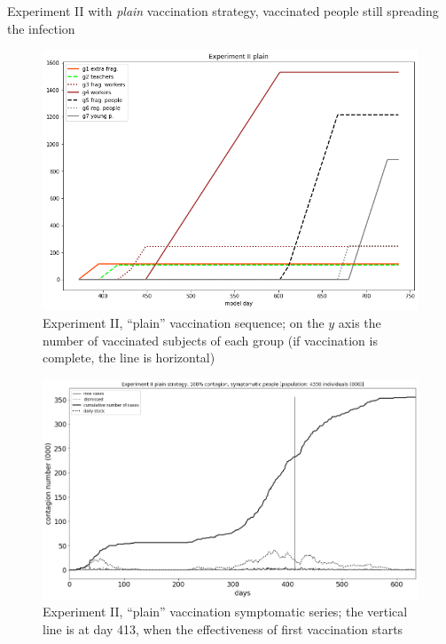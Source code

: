 \documentclass[8pt]{beamer}
\begin{document}
\begin{frame}{Experiment II with \emph{plain} vaccination strategy, vaccinated people still spreading the infection}

\begin{figure}[H]
\center
\includegraphics[scale=0.14]{Experiment_II_plainVaccinationSequence.png} %

\caption{Experiment II, ``plain'' vaccination sequence; on the $y$ axis the number of vaccinated subjects of each group (if vaccination is complete, the line is horizontal)} 
\label{Experiment_II_plainVaccinationSequence}
\end{figure}

\begin{figure}[H]
\center
\includegraphics[scale=0.16]{Experiment_II_1_plain_symptomatic_series.png} 

\caption{Experiment II, ``plain'' vaccination symptomatic series; the vertical line is at day 413, when the effectiveness of first vaccination starts} 
\label{Experiment__plainSymptomaticSeries}
\end{figure}



\end{frame}
\end{document}
